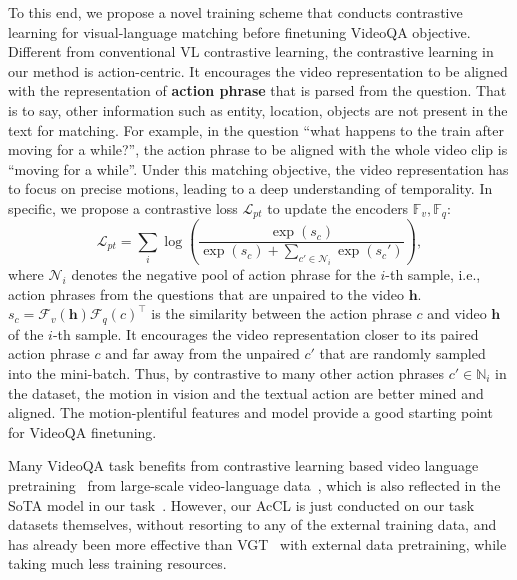 \documentclass[sigconf]{acmart}
\begin{document}
To this end, we propose a novel training scheme that conducts contrastive learning for visual-language matching before finetuning VideoQA objective. Different from conventional VL contrastive learning, the contrastive learning in our method is action-centric. 
It encourages the video representation to be aligned with the representation of \textbf{action phrase} that is parsed from the question. That is to say, other information such as entity, location, objects are not present in the text for matching. For example, in the question ``what happens to the train after moving for a while?'', the action phrase to be aligned with the whole video clip is ``moving for a while''.
Under this matching objective, the video representation has to focus on precise motions, leading to a deep understanding of temporality. 
In specific, we propose a contrastive loss $\mathcal{L}_{pt}$ to update the encoders $\mathbb{F}_v, \mathbb{F}_q$:
\begin{equation}
    \mathcal{L}_{pt}=\sum\limits_i \log\left(\frac{\exp{(s_c)}}{\exp{(s_c)}+\sum\nolimits_{c'\in \mathcal{N}_i} \exp{(s_c')} }\right), 
\label{eq:contrast}
\end{equation}
where $\mathcal{N}_i$ denotes the negative pool of action phrase for the $i$-th sample, i.e., action phrases from the questions that are unpaired to the video $\mathbf{h}$. $s_{c} = \mathcal{F}_v(\mathbf{h})\mathcal{F}_q(c)^{\top}$ is the similarity between the action phrase $c$ and video $\mathbf{h}$ of the $i$-th sample. 
It encourages the video representation closer to its paired action phrase $c$ and far away from the unpaired $c'$ that are randomly sampled into the mini-batch.
Thus, by contrastive to many other action phrases $c'\in{\mathbb{N}_i}$ in the dataset, the motion in vision and the textual action are better mined and aligned. The motion-plentiful features and model provide a good starting point for VideoQA finetuning.

Many VideoQA task benefits from contrastive learning based video language pretraining~\cite{lei2021less,zellers2021merlot} from large-scale video-language data~\cite{bain2021frozen}, which is also reflected in the SoTA model in our task~\cite{xiao2022vgt}. However, our AcCL is just conducted on our task datasets themselves, without resorting to any of the external training data, and has already been more effective than VGT~\cite{xiao2022vgt} with external data pretraining, while taking much less training resources.
\end{document}
